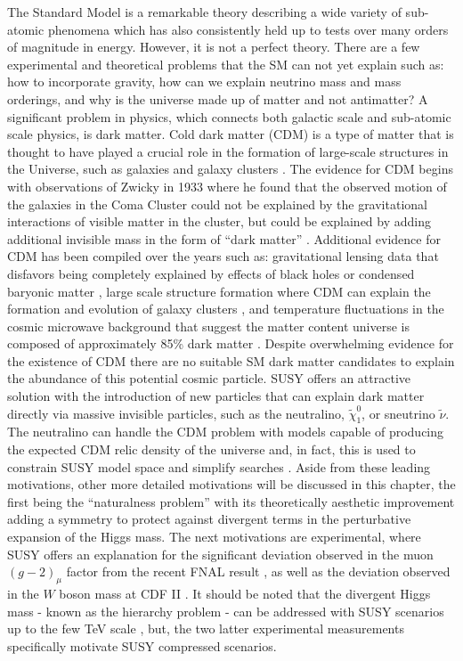 The Standard Model is a remarkable theory describing a wide variety of sub-atomic phenomena which has also consistently held up to tests over many orders of magnitude in energy. However, it is not a perfect theory. There are a few  experimental and theoretical problems that the SM can not yet explain such as: how to incorporate gravity,  how can we explain neutrino mass and mass orderings, and why is the universe made up of matter and not antimatter?  
A significant problem in physics, which connects both galactic scale and sub-atomic scale physics, is dark matter. Cold dark matter (CDM) is a type of matter that is thought to have played a crucial role in the formation of large-scale structures in the Universe, such as galaxies and galaxy clusters \cite{Garrett:2010hd}. The evidence for CDM begins with observations of Zwicky in 1933 where he found that the observed motion of the galaxies in the Coma Cluster could not be explained by the gravitational interactions of visible matter in the cluster, but could be explained by adding additional invisible mass in the form of ``dark matter'' \cite{Zwicky:1933gu}. Additional evidence for CDM has been compiled over the years such as: gravitational lensing data that disfavors being completely explained by effects of black holes or condensed baryonic matter \cite{Massey:2007lens}, large scale structure formation where CDM can explain the formation and evolution of galaxy clusters \cite{Springel:2005}, and temperature fluctuations in the cosmic microwave background that suggest the matter content universe is composed of approximately 85\% dark matter \cite{Planck:2018vyg}. Despite overwhelming evidence for the existence of CDM there are no suitable SM dark matter candidates to explain the abundance of this potential cosmic particle. SUSY offers an attractive solution with the introduction of new particles that can explain dark matter directly via massive invisible particles, such as the neutralino, $\tilde{\chi}_1^0$, or sneutrino $\tilde{\nu}$. The neutralino can handle the CDM problem with models capable of producing the expected CDM relic density of the universe and, in fact, this is used to constrain SUSY model space and simplify searches \cite{SvenTalkgm2}. Aside from these leading motivations, other more detailed motivations will be discussed in this chapter, the first being the ``naturalness problem'' with its theoretically aesthetic improvement adding a symmetry to protect against divergent terms in the perturbative expansion of the Higgs mass. The next motivations are experimental, where SUSY offers an explanation for the significant deviation observed in the muon $(g-2)_\mu$ factor from the recent FNAL result \cite{Muong-2:2021ojo}, as well as the deviation observed in the $W$ boson mass at CDF II \cite{CDF:2022hxs}. It should be noted that the divergent Higgs mass - known as the hierarchy problem - can be addressed with SUSY scenarios up to the few TeV scale \cite{Barbieri:1987fn}, but, the two latter experimental measurements specifically motivate SUSY compressed scenarios.



